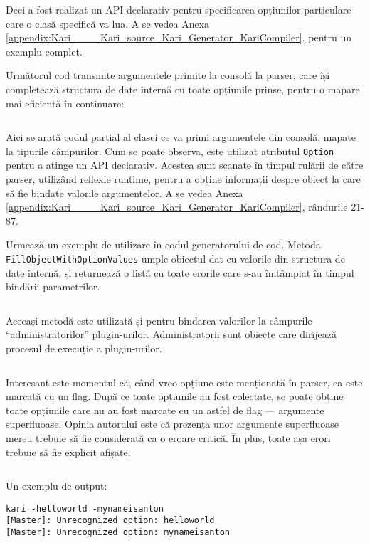 \documentclass[a4paper,12pt]{report}
\begin{document}
Deci a fost realizat un \ac{API} declarativ pentru specificarea opțiunilor particulare care o clasă specifică va lua.
A se vedea Anexa \ref{appendix:Kari____Kari_source_Kari_Generator_KariCompiler}.
pentru un exemplu complet.

Următorul cod transmite argumentele primite la consolă la parser, care își completează structura de date internă cu toate opțiunile prinse, pentru o mapare mai eficientă în continuare:
\inputminted[firstline=126, lastline=132]{cs}{../Kari/source/Kari.Generator/KariCompiler.cs}

Aici se arată codul parțial al clasei ce va primi argumentele din consolă, mapate la tipurile câmpurilor.
Cum se poate observa, este utilizat atributul \texttt{Option} pentru a atinge un \ac{API} declarativ.
Acestea sunt scanate în timpul rulării de către parser, utilizând reflexie runtime, pentru a obține informații despre obiect la care să fie bindate valorile argumentelor.
A se vedea Anexa \ref{appendix:Kari____Kari_source_Kari_Generator_KariCompiler}, rândurile 21-87.

Urmează un exemplu de utilizare în codul generatorului de cod.
Metoda \texttt{FillObjectWithOptionValues} umple obiectul dat cu valorile din structura de date internă, și returnează o listă cu toate erorile care s-au îmtâmplat în timpul bindării parametrilor.
\inputminted[firstline=147, lastline=155]{cs}{../Kari/source/Kari.Generator/KariCompiler.cs}

Aceeași metodă este utilizată și pentru bindarea valorilor la câmpurile ``administratorilor'' plugin-urilor.
Administratorii sunt obiecte care dirijează procesul de execuție a plugin-urilor.
\inputminted[firstline=208, lastline=221]{cs}{../Kari/source/Kari.GeneratorCore/Workflow/MasterEnvironment.cs}


Interesant este momentul că, când vreo opțiune este menționată în parser, ea este marcată cu un flag.
După ce toate opțiunile au fost colectate, se poate obține toate opțiunile care nu au fost marcate cu un astfel de flag --- argumente superfluoase.
Opinia autorului este că prezența unor argumente superfluoase mereu trebuie să fie considerată ca o eroare critică.
În plus, toate așa erori trebuie să fie explicit afișate.
\inputminted[firstline=446, lastline=460]{cs}{../Kari/source/Kari.Generator/KariCompiler.cs}

Un exemplu de output:

\begin{verbatim}
kari -helloworld -mynameisanton
[Master]: Unrecognized option: helloworld
[Master]: Unrecognized option: mynameisanton
\end{verbatim}
\end{document}
